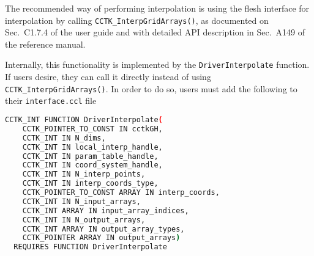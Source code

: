 The recommended way of performing interpolation is using the flesh interface for interpolation by calling \texttt{CCTK\_InterpGridArrays()}, as documented on Sec.~C1.7.4 of the \Cactus\space user guide and with detailed API description in Sec.~A149 of the \Cactus\space reference manual.

Internally, this functionality is implemented by the \texttt{DriverInterpolate} function. If users desire, they can call it directly instead of using \texttt{CCTK\_InterpGridArrays()}. In order to do so, users must add the following to their \texttt{interface.ccl} file
%
\begin{lstlisting}[language=bash]
  CCTK_INT FUNCTION DriverInterpolate(
    CCTK_POINTER_TO_CONST IN cctkGH,
    CCTK_INT IN N_dims,
    CCTK_INT IN local_interp_handle,
    CCTK_INT IN param_table_handle,
    CCTK_INT IN coord_system_handle,
    CCTK_INT IN N_interp_points,
    CCTK_INT IN interp_coords_type,
    CCTK_POINTER_TO_CONST ARRAY IN interp_coords,
    CCTK_INT IN N_input_arrays,
    CCTK_INT ARRAY IN input_array_indices,
    CCTK_INT IN N_output_arrays,
    CCTK_INT ARRAY IN output_array_types,
    CCTK_POINTER ARRAY IN output_arrays)
  REQUIRES FUNCTION DriverInterpolate
\end{lstlisting}

